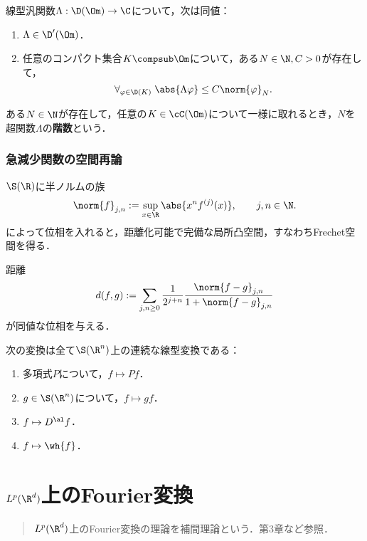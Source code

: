 \documentclass[uplatex,dvipdfmx]{jsreport}
\begin{document}
\begin{corollary}
    線型汎関数$\Lambda:\D(\Om)\to\C$について，次は同値：
    \begin{enumerate}
        \item $\Lambda\in\D'(\Om)$．
        \item 任意のコンパクト集合$K\compsub\Om$について，ある$N\in\N,C>0$が存在して，
        \[\forall_{\varphi\in\D(K)}\;\abs{\Lambda\varphi}\le C\norm{\varphi}_N.\]
    \end{enumerate}
    ある$N\in\N$が存在して，任意の$K\in\cC(\Om)$について一様に取れるとき，$N$を超関数$\Lambda$の\textbf{階数}という．
\end{corollary}

\subsection{急減少関数の空間再論}

\begin{definition}
    $\S(\R)$に半ノルムの族
    \[\norm{f}_{j,n}:=\sup_{x\in\R}\abs{x^nf^{(j)}(x)},\qquad j,n\in\N.\]
    によって位相を入れると，距離化可能で完備な局所凸空間，すなわちFrechet空間を得る．
\end{definition}
\begin{Proof}
    距離
    \[d(f,g):=\sum_{j,n\ge0}\frac{1}{2^{j+n}}\frac{\norm{f-g}_{j,n}}{1+\norm{f-g}_{j,n}}\]
    が同値な位相を与える．
\end{Proof}

\begin{proposition}
    次の変換は全て$\S(\R^n)$上の連続な線型変換である：
    \begin{enumerate}
        \item 多項式$P$について，$f\mapsto Pf$．
        \item $g\in\S(\R^n)$について，$f\mapsto gf$．
        \item $f\mapsto D^\al f$．
        \item $f\mapsto\wh{f}$．
    \end{enumerate}
\end{proposition}

\chapter{$L^p(\R^d)$上のFourier変換}

\begin{quotation}
    $L^p(\R^d)$上のFourier変換の理論を補間理論という．\cite{Pinsky09-Wavelet}第3章など参照．
\end{quotation}
\end{document}
